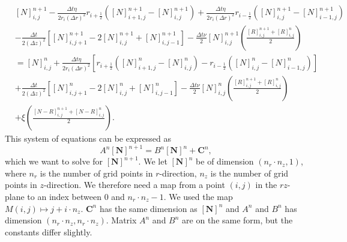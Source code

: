 \documentclass{article}
\begin{document}
\begin{align*}
    & [N]_{i,j}^{n+1} - \frac{\Delta t \eta }{2 r_i (\Delta r)^2} r_{i+\frac{1}{2}} \left( [N]_{i+1,j}^{n+1} - [N]_{i,j}^{n+1} \right) + \frac{\Delta t \eta}{2 r_i (\Delta r)^2} r_{i-\frac{1}{2}} \left( [N]_{i,j}^{n+1} - [N]_{i-1,j}^{n+1} \right) \\  
    &- \frac{\Delta t}{2 (\Delta z)^2} \left[ [N]_{i,j+1}^{n+1} - 2[N]_{i,j}^{n+1} + [N]_{i,j-1}^{n+1} \right]  - \frac{\Delta t \nu}{2} [N]_{i,j}^{n+1} \left( \frac{[R]_{i,j}^{n+1} + [R]_{i,j}^{n}}{2} \right) \\ 
    &= [N]_{i,j}^{n} + \frac{\Delta t \eta}{2 r_i (\Delta r)^2} \left[r_{i+\frac{1}{2}} \left( [N]_{i+1,j}^{n} - [N]_{i,j}^{n} \right) - r_{i-\frac{1}{2}} \left( [N]_{i,j}^{n} - [N]_{i-1,j}^{n} \right) \right] \\
    &+ \frac{\Delta t}{2 (\Delta z)^2} \left[ [N]_{i,j+1}^{n} - 2[N]_{i,j}^{n} + [N]_{i,j-1}^{n} \right] -  \frac{\Delta t \nu}{2} [N]_{i,j}^{n} \left( \frac{[R]_{i,j}^{n+1} + [R]_{i,j}^{n}}{2} \right) \\
    &+  \xi \left( \frac{[N-R]_{i,j}^{n+1} + [N-R]_{i,j}^{n}}{2} \right).
\end{align*}
This system of equations can be expressed as
\begin{equation}
    A^{n} \boldsymbol{[N]}^{n+1} = B^{n} \boldsymbol{[N]}^{n} + \boldsymbol{C}^{n},
\end{equation}
which we want to solve for $\boldsymbol{[N]}^{n+1}$. We let  $\boldsymbol{[N]}^{n}$ be of dimension $(n_r \cdot n_z, 1)$, where $n_r$ is the number of grid points in $r$-direction, $n_z$ is the number of grid points in $z$-direction. We therefore need a map from a point $(i,j)$ in the $rz$-plane to an index between $0$ and $n_r \cdot n_z - 1$. We used the map $M(i,j) \mapsto j + i \cdot n_z$. $\boldsymbol{C}^n$ has the same dimension as $\boldsymbol{[N]}^n$ and $A^n$ and $B^n$ has dimension $(n_r \cdot n_z, n_r \cdot n_z)$. Matrix $A^n$ and $B^n$ are on the same form, but the constants differ slightly.
\end{document}
